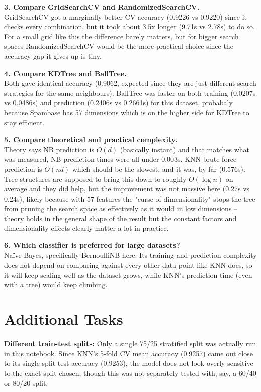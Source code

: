 \documentclass[12pt,a4paper]{article}
\begin{document}
\textbf{3. Compare GridSearchCV and RandomizedSearchCV.}\\
GridSearchCV got a marginally better CV accuracy (0.9226 vs 0.9220) since it checks every combination, but it took about 3.5x longer (9.71s vs 2.78s) to do so. For a small grid like this the difference barely matters, but for bigger search spaces RandomizedSearchCV would be the more practical choice since the accuracy gap it gives up is tiny.

\textbf{4. Compare KDTree and BallTree.}\\
Both gave identical accuracy (0.9062, expected since they are just different search strategies for the same neighbours). BallTree was faster on both training (0.0207s vs 0.0486s) and prediction (0.2406s vs 0.2661s) for this dataset, probabaly because Spambase has 57 dimensions which is on the higher side for KDTree to stay efficient.

\textbf{5. Compare theoretical and practical complexity.}\\
Theory says NB prediction is $O(d)$ (basically instant) and that matches what was measured, NB prediction times were all under 0.003s. KNN brute-force prediction is $O(nd)$ which should be the slowest, and it was, by far (0.576s). Tree structures are supposed to bring this down to roughly $O(\log n)$ on average and they did help, but the improvement was not massive here (0.27s vs 0.24s), likely because with 57 features the "curse of dimensionality" stops the tree from pruning the search space as effectively as it would in low dimensions -- theory holds in the general shape of the result but the constant factors and dimensionality effects clearly matter a lot in practice.

\textbf{6. Which classifier is preferred for large datasets?}\\
Na\"ive Bayes, specifically BernoulliNB here. Its training and prediction complexity does not depend on comparing against every other data point like KNN does, so it will keep scaling well as the dataset grows, while KNN's prediction time (even with a tree) would keep climbing.

\section{Additional Tasks}

\textbf{Different train-test splits:} Only a single 75/25 stratified split was actually run in this notebook. Since KNN's 5-fold CV mean accuracy (0.9257) came out close to its single-split test accuracy (0.9253), the model does not look overly sensitive to the exact split chosen, though this was not separately tested with, say, a 60/40 or 80/20 split.
\end{document}
